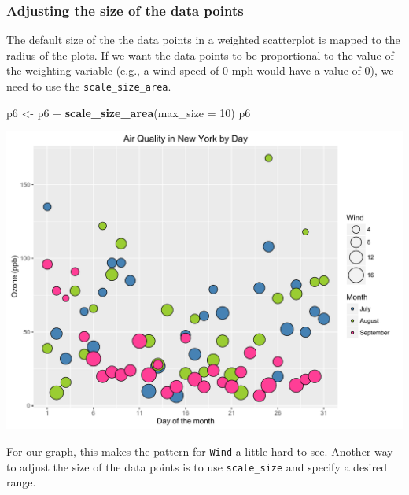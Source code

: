 \documentclass[]{article}
\newenvironment{Shaded}{\begin{snugshade}}{\end{snugshade}}
\newcommand{\KeywordTok}[1]{\textcolor[rgb]{0.13,0.29,0.53}{\textbf{{#1}}}}
\newcommand{\DataTypeTok}[1]{\textcolor[rgb]{0.13,0.29,0.53}{{#1}}}
\newcommand{\DecValTok}[1]{\textcolor[rgb]{0.00,0.00,0.81}{{#1}}}
\newcommand{\StringTok}[1]{\textcolor[rgb]{0.31,0.60,0.02}{{#1}}}
\newcommand{\NormalTok}[1]{{#1}}
\begin{document}
\subsubsection{Adjusting the size of the data
points}\label{adjusting-the-size-of-the-data-points}

The default size of the the data points in a weighted scatterplot is
mapped to the radius of the plots. If we want the data points to be
proportional to the value of the weighting variable (e.g., a wind speed
of 0 mph would have a value of 0), we need to use the
\texttt{scale\_size\_area}.

\begin{Shaded}
\begin{Highlighting}[]
\NormalTok{p6 <-}\StringTok{ }\NormalTok{p6 +}\StringTok{ }\KeywordTok{scale_size_area}\NormalTok{(}\DataTypeTok{max_size =} \DecValTok{10}\NormalTok{)}
\NormalTok{p6}
\end{Highlighting}
\end{Shaded}

\begin{center}\includegraphics{0_all_posts_pdf/wscatter_12-1} \end{center}

For our graph, this makes the pattern for \texttt{Wind} a little hard to
see. Another way to adjust the size of the data points is to use
\texttt{scale\_size} and specify a desired range.
\end{document}
